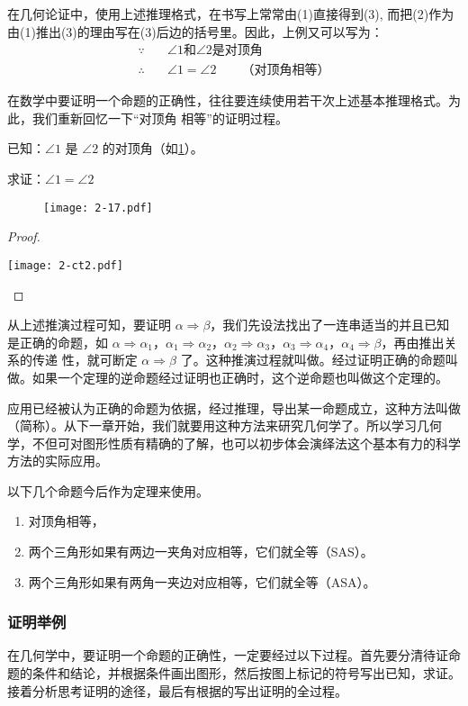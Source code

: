 在几何论证中，使用上述推理格式，在书写上常常由(1)直接得到(3), 而把(2)作为由(1)推出(3)的理由写在(3)后边的括号里。因此，上例又可以写为：
\[\begin{split}
	\because&\quad \text{$\angle 1$和$\angle 2$是对顶角}\\
	\therefore&\quad  \angle 1=\angle 2 \qquad \text{（对顶角相等）}
\end{split}\]

在数学中要证明一个命题的正确性，往往要连续使用若干次上述基本推理格式。为此，我们重新回忆一下“对顶角
相等”的证明过程。

已知：$\angle 1$ 是 $\angle 2$ 的对顶角（如\cref{fig:2-17}）。

求证：$\angle 1=\angle 2$
\begin{figure}
	\texttt{[image: 2-17.pdf]}
	\caption{}\label{fig:2-17}
\end{figure}

\begin{proof}
	\begin{center}
		\texttt{[image: 2-ct2.pdf]}
	\end{center}
\end{proof}

从上述推演过程可知，要证明 $\alpha \Rightarrow \beta$，我们先设法找出了一连串适当的并且已知是正确的命题，如
$\alpha \Rightarrow \alpha_1$，$\alpha_1\Rightarrow 
\alpha_2$，$\alpha_2\Rightarrow \alpha_3$，$\alpha_3\Rightarrow \alpha_4$，$\alpha_4\Rightarrow \beta$，再由推出关系的传递
性，就可断定 $\alpha \Rightarrow\beta$ 了。这种推演过程就叫做。经过证明正确的命题叫做。如果一个定理的逆命题经过证明也正确时，这个逆命题也叫做这个定理的。

应用已经被认为正确的命题为依据，经过推理，导出某一命题成立，这种方法叫做（简称）。从下一章开始，我们就要用这种方法来研究几何学了。所以学习几何学，不但可对图形性质有精确的了解，也可以初步体会演绎法这个基本有力的科学方法的实际应用。

以下几个命题今后作为定理来使用。
\begin{enumerate}
	\item 对顶角相等，
	\item 两个三角形如果有两边一夹角对应相等，它们就全等（SAS）。
	\item 两个三角形如果有两角一夹边对应相等，它们就全等（ASA）。
\end{enumerate}

\subsubsection{证明举例}
在几何学中，要证明一个命题的正确性，一定要经过以下过程。首先要分清待证命题的条件和结论，并根据条件画出图形，然后按图上标记的符号写出已知，求证。接着分析思考证明的途径，最后有根据的写出证明的全过程。

